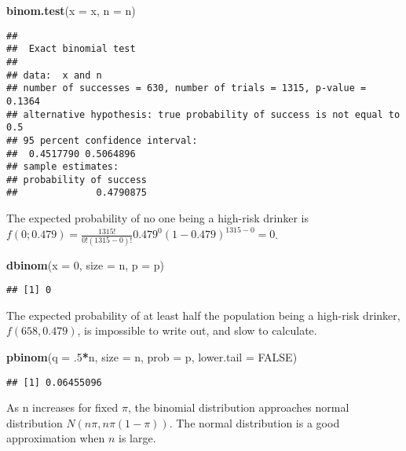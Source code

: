 \documentclass[
]{book}
\newenvironment{Shaded}{\begin{snugshade}}{\end{snugshade}}
\newcommand{\DataTypeTok}[1]{\textcolor[rgb]{0.13,0.29,0.53}{#1}}
\newcommand{\DecValTok}[1]{\textcolor[rgb]{0.00,0.00,0.81}{#1}}
\newcommand{\FloatTok}[1]{\textcolor[rgb]{0.00,0.00,0.81}{#1}}
\newcommand{\KeywordTok}[1]{\textcolor[rgb]{0.13,0.29,0.53}{\textbf{#1}}}
\newcommand{\NormalTok}[1]{#1}
\newcommand{\OperatorTok}[1]{\textcolor[rgb]{0.81,0.36,0.00}{\textbf{#1}}}
\newcommand{\OtherTok}[1]{\textcolor[rgb]{0.56,0.35,0.01}{#1}}
\begin{document}
\begin{Shaded}
\begin{Highlighting}[]
\KeywordTok{binom.test}\NormalTok{(}\DataTypeTok{x =}\NormalTok{ x, }\DataTypeTok{n =}\NormalTok{ n)}
\end{Highlighting}
\end{Shaded}

\begin{verbatim}
## 
##  Exact binomial test
## 
## data:  x and n
## number of successes = 630, number of trials = 1315, p-value = 0.1364
## alternative hypothesis: true probability of success is not equal to 0.5
## 95 percent confidence interval:
##  0.4517790 0.5064896
## sample estimates:
## probability of success 
##              0.4790875
\end{verbatim}

The expected probability of no one being a high-risk drinker is \(f(0;0.479) = \frac{1315!}{0!(1315-0)!} 0.479^0 (1-0.479)^{1315-0} = 0\).

\begin{Shaded}
\begin{Highlighting}[]
\KeywordTok{dbinom}\NormalTok{(}\DataTypeTok{x =} \DecValTok{0}\NormalTok{, }\DataTypeTok{size =}\NormalTok{ n, }\DataTypeTok{p =}\NormalTok{ p)}
\end{Highlighting}
\end{Shaded}

\begin{verbatim}
## [1] 0
\end{verbatim}

The expected probability of at least half the population being a high-risk drinker, \(f(658, 0.479)\), is impossible to write out, and slow to calculate.

\begin{Shaded}
\begin{Highlighting}[]
\KeywordTok{pbinom}\NormalTok{(}\DataTypeTok{q =} \FloatTok{.5}\OperatorTok{*}\NormalTok{n, }\DataTypeTok{size =}\NormalTok{ n, }\DataTypeTok{prob =}\NormalTok{ p, }\DataTypeTok{lower.tail =} \OtherTok{FALSE}\NormalTok{)}
\end{Highlighting}
\end{Shaded}

\begin{verbatim}
## [1] 0.06455096
\end{verbatim}

As n increases for fixed \(\pi\), the binomial distribution approaches normal distribution \(N(n\pi, n\pi(1−\pi))\). The normal distribution is a good approximation when \(n\) is large.
\end{document}
